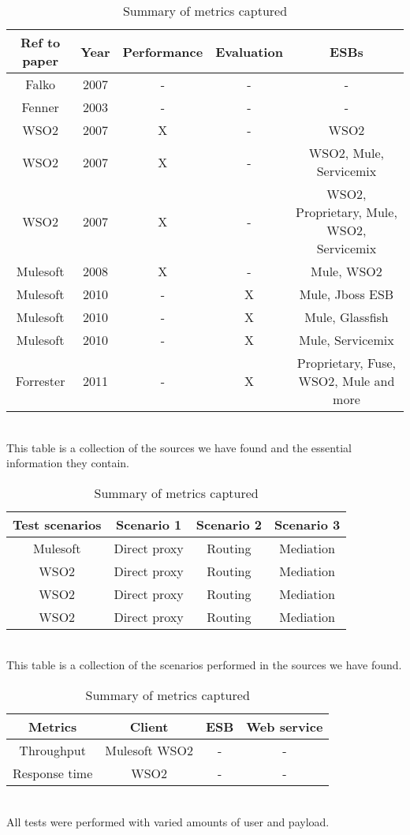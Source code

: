 \begin{table}
	\caption{Summary of industrial papers and what tests they perform}
	\begin{tabular}{c c c c c}

		Ref to paper & Year & Performance & Evaluation & ESBs \\ 
		\hline	
		Falko \cite{falko07} & 2007 & - & - & - \\ 
		Fenner \cite{fenner03} & 2003 & - & - & - \\
		WSO2 \cite{Perera07} & 2007 & X & - & WSO2 \\
		WSO2 \cite{Perera07R2} & 2007 & X & - & WSO2, Mule, Servicemix\\
		WSO2 \cite{Perera07R3} & 2007 & X & - & WSO2, Proprietary, Mule, WSO2, Servicemix \\
		Mulesoft \cite{mulesoft08} & 2008 & X & - & Mule, WSO2\\
		Mulesoft \cite{mulevsjboss} & 2010 & - & X & Mule, Jboss ESB\\
		Mulesoft \cite{mulevsglassfish} & 2010 & - & X & Mule, Glassfish \\
		Mulesoft \cite{mulevsservicemix} & 2010 & - & X & Mule, Servicemix \\
		Forrester \cite{forrester11} & 2011 & - & X & Proprietary, Fuse, WSO2, Mule and more\\
		\hline
	\end{tabular}
	\\
	This table is a collection of the sources we have found and the essential information they contain.

	\caption{Summary of the scenarios in the industrial performance tests}
	\begin{tabular}{c c c c}
		\hline
		Test scenarios & Scenario 1 & Scenario 2 & Scenario 3 \\
		\hline
		Mulesoft \cite{mulesoft08} & Direct proxy & Routing & Mediation \\	
		WSO2 \cite{Perera07} & Direct proxy & Routing & Mediation \\
		WSO2 \cite{Perera07R2} & Direct proxy & Routing & Mediation \\
		WSO2 \cite{Perera07R3} & Direct proxy & Routing & Mediation \\
		\hline
	\end{tabular}
	\\
	This table is a collection of the scenarios performed in the sources we have found. 
	
	\caption{Summary of metrics captured}
	\begin{tabular}{c c c c}
	Metrics &  Client & ESB & Web service \\
	\hline
	Throughput & Mulesoft \cite{mulesoft08} WSO2 \cite{Perera07R2,Perera07R3} & - & - \\
	Response time & WSO2 \cite{Perera07} & - & - \\
	\hline
	\end{tabular}
	\\
	All tests were performed with varied amounts of user and payload.
\end{table}

